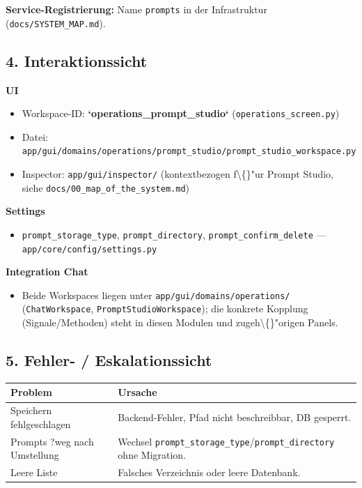 \textbf{Service-Registrierung:} Name \texttt{prompts} in der Infrastruktur (\texttt{docs/SYSTEM\_MAP.md}).

\subsection{4. Interaktionssicht}

\textbf{UI}

\begin{itemize}
\item Workspace-ID: \textbf{`operations\_prompt\_studio`} (\texttt{operations\_screen.py})
\item Datei: \texttt{app/gui/domains/operations/prompt\_studio/prompt\_studio\_workspace.py}
\item Inspector: \texttt{app/gui/inspector/} (kontextbezogen f\textbackslash\{\}"ur Prompt Studio, siehe \texttt{docs/00\_map\_of\_the\_system.md})
\end{itemize}

\textbf{Settings}

\begin{itemize}
\item \texttt{prompt\_storage\_type}, \texttt{prompt\_directory}, \texttt{prompt\_confirm\_delete} --- \texttt{app/core/config/settings.py}
\end{itemize}

\textbf{Integration Chat}

\begin{itemize}
\item Beide Workspaces liegen unter \texttt{app/gui/domains/operations/} (\texttt{ChatWorkspace}, \texttt{PromptStudioWorkspace}); die konkrete Kopplung (Signale/Methoden) steht in diesen Modulen und zugeh\textbackslash\{\}"origen Panels.
\end{itemize}

\subsection{5. Fehler- / Eskalationssicht}

\begin{center}
\begin{tabular}{ll}
\hline
Problem & Ursache \\
\hline
Speichern fehlgeschlagen & Backend-Fehler, Pfad nicht beschreibbar, DB gesperrt. \\
Prompts ?weg\texttt{} nach Umstellung & Wechsel \texttt{prompt\_storage\_type}/\texttt{prompt\_directory} ohne Migration. \\
Leere Liste & Falsches Verzeichnis oder leere Datenbank. \\
\hline
\end{tabular}
\end{center}

